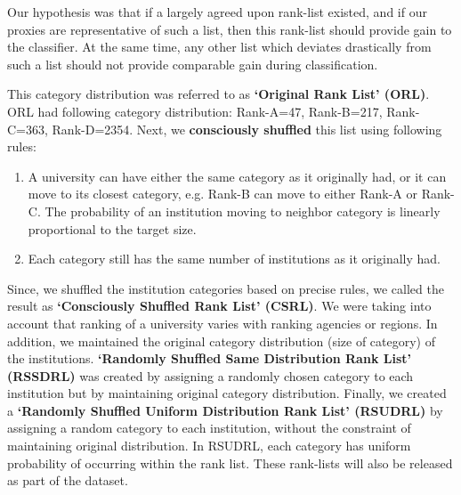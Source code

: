 \documentclass{sig-alternate-05-2015}
\begin{document}
Our hypothesis was that if a largely agreed upon rank-list existed, and if our proxies are representative of such a list, then this rank-list should provide gain to the classifier. At the same time, any other list which deviates drastically from such a list should not provide comparable gain during classification.

This category distribution was referred to as \textbf{`Original Rank List' (ORL)}. ORL had following category distribution: Rank-A=47, Rank-B=217, Rank-C=363, Rank-D=2354. Next, we \textbf{consciously shuffled} this list using following rules:
\begin{enumerate}
\item A university can have either the same category as it originally had, or it can move to its closest category, e.g. Rank-B can move to either Rank-A or Rank-C. The probability of an institution moving to neighbor category is linearly proportional to the target size.
\item Each category still has the same number of institutions as it originally had.
\end{enumerate}

Since, we shuffled the institution categories based on precise rules, we called the result as \textbf{`Consciously Shuffled Rank List' (CSRL)}. We were taking into account that ranking of a university varies with ranking agencies or regions. In addition, we maintained the original category distribution (size of category) of the institutions. \textbf{`Randomly Shuffled Same Distribution Rank List' (RSSDRL)} was created by assigning a randomly chosen category to each institution but by maintaining original category distribution. Finally, we created a \textbf{`Randomly Shuffled Uniform Distribution Rank List' (RSUDRL)} by assigning a random category to each institution, without the constraint of maintaining original distribution. In RSUDRL, each category has uniform probability of occurring within the rank list. These rank-lists will also be released as part of the dataset.
\end{document}
